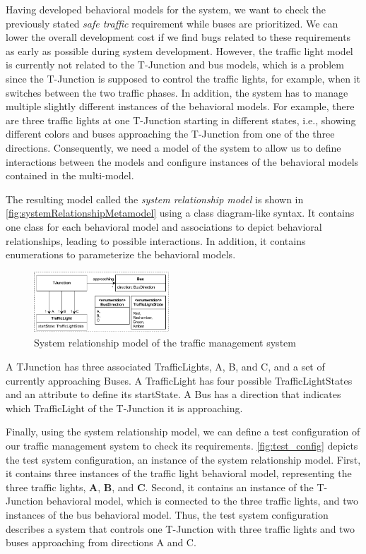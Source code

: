 \documentclass{jot}
\begin{document}
Having developed behavioral models for the system, we want to check the previously stated \emph{safe traffic} requirement while buses are prioritized.
We can lower the overall development cost if we find bugs related to these requirements as early as possible during system development.
However, the traffic light model is currently not related to the T-Junction and bus models, which is a problem since the T-Junction is supposed to control the traffic lights, for example, when it switches between the two traffic phases.
In addition, the system has to manage multiple slightly different instances of the behavioral models.
For example, there are three traffic lights at one T-Junction starting in different states, i.e., showing different colors and buses approaching the T-Junction from one of the three directions.
Consequently, we need a model of the system to allow us to define interactions between the models and configure instances of the behavioral models contained in the multi-model.

The resulting model called the \emph{system relationship model} is shown in \autoref{fig:systemRelationshipMetamodel} using a class diagram-like syntax.
It contains one class for each behavioral model and associations to depict behavioral relationships, leading to possible interactions.
In addition, it contains enumerations to parameterize the behavioral models.

\begin{figure}[h]
    \centering
    \includegraphics[width=0.45\textwidth]{figures/systems.pdf}
    \caption{System relationship model of the traffic management system}
    \label{fig:systemInteractionModel}
\end{figure}

A \textsf{TJunction} has three associated \textsf{TrafficLight}s, A, B, and C, and a set of currently approaching \textsf{Bus}es.
A \textsf{TrafficLight} has four possible \textsf{TrafficLightState}s and an attribute to define its \textsf{startState}.
A \textsf{Bus} has a \textsf{direction} that indicates which \textsf{TrafficLight} of the T-Junction it is approaching.

Finally, using the system relationship model, we can define a test configuration of our traffic management system to check its requirements.
\autoref{fig:test_config} depicts the test system configuration, an instance of the system relationship model.
First, it contains three instances of the traffic light behavioral model, representing the three traffic lights, \textbf{A}, \textbf{B}, and \textbf{C}.
Second, it contains an instance of the T-Junction behavioral model, which is connected to the three traffic lights, and two instances of the bus behavioral model.
Thus, the test system configuration describes a system that controls one T-Junction with three traffic lights and two buses approaching from directions A and C.
\end{document}
